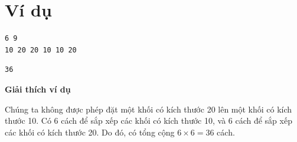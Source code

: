 \documentclass[12pt,a4paper]{article}
\newcommand{\explanation}{%
  \vspace{6pt}\textbf{\textcolor{sectioncolor}{Giải thích ví dụ}}\par\vspace{2pt}%
}
\begin{document}
\section*{Ví dụ}
\begin{inputbox}
\begin{lstlisting}
6 9
10 20 20 10 10 20
\end{lstlisting}
\end{inputbox}
\begin{outputbox}
\begin{lstlisting}
36
\end{lstlisting}
\end{outputbox}

\explanation
Chúng ta không được phép đặt một khối có kích thước 20 lên một khối có kích thước 10. Có 6 cách để sắp xếp các khối có kích thước 10, và 6 cách để sắp xếp các khối có kích thước 20. Do đó, có tổng cộng $6 \times 6 = 36$ cách.

\newpage
\end{document}
